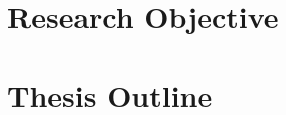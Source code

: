 














\section{Research Objective}
\label{sec:ResearchObjective}


\section{Thesis Outline}
\label{sec:ThesisOutline}


